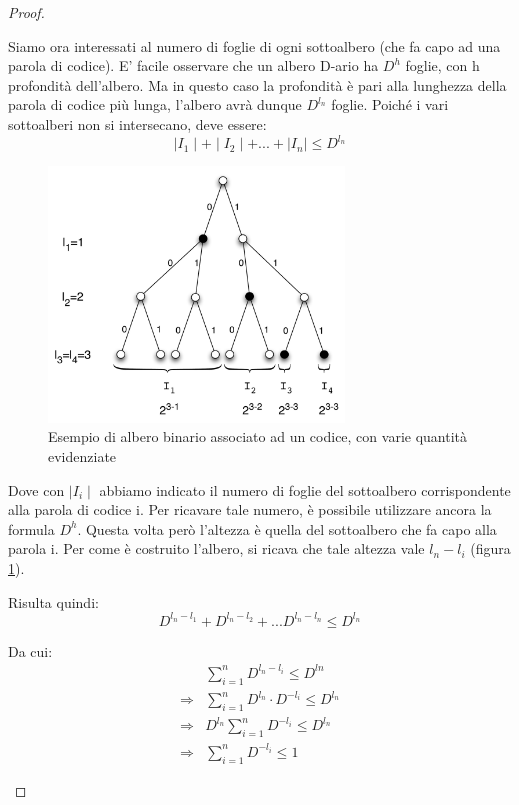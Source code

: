 \begin{teorema}
\begin{proof}
\begin{description}
Siamo ora interessati al numero di foglie di ogni sottoalbero (che fa capo ad una parola di codice). E' facile osservare che un albero 
D-ario ha \(D^{h}\) foglie, con h profondità dell'albero. Ma in questo caso la profondità è pari alla lunghezza della parola di codice più lunga, l'albero avrà dunque \(D^{l_n}\) foglie. Poiché i vari sottoalberi non si intersecano, deve essere:
\[
 \mid I_1 \mid + \mid I_2 \mid + ... + \mid I_n \mid \le D^{l_n}
\]

\begin{figure}[htbp]
\begin{center}
	\includegraphics[width=0.7\textwidth]{img/kraft2.pdf}
\caption{Esempio di albero binario associato ad un codice, con varie quantità evidenziate}
\label{fig:albero2}
\end{center}
\end{figure}

Dove con $\mid I_i \mid$ abbiamo indicato il numero di foglie del sottoalbero corrispondente alla parola di codice i.
Per ricavare tale numero, è possibile utilizzare ancora la formula \(D^{h}\). Questa volta però l'altezza è quella del sottoalbero 
che fa capo alla parola i. Per come è costruito l'albero, si ricava che tale altezza vale $l_n-l_i$ (figura \ref{fig:albero2}).

Risulta quindi:
\[ D^{l_n- l_1} + D^{l_n- l_2} + ... D^{l_n- l_n} \leq D^{l_n}\]

Da cui:
\[\begin{split}
 &\sum_{i = 1}^n D^{l_n-l_i} \leq D^{ln} \\
 \Rightarrow &\sum_{i = 1}^n D^{l_n} \cdot D^{-l_i} \leq D^{l_n} \\
 \Rightarrow &D^{l_n} \sum_{i = 1}^n D^{-l_i} \leq D^{l_n} \\
 \Rightarrow &\sum_{i = 1}^n D^{-l_i} \leq 1
 \end{split}
\]


\end{description}
\end{proof}
\end{teorema}
